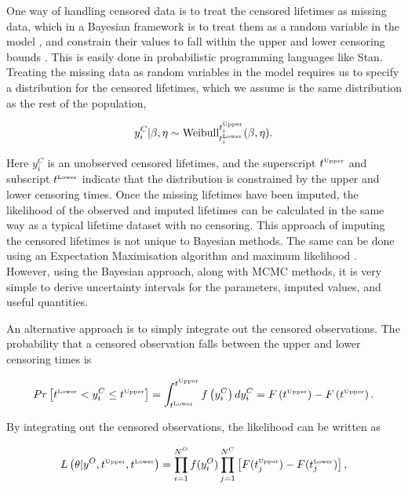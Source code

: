One way of handling censored data is to treat the censored lifetimes as missing data, which in a Bayesian framework is to treat them as a random variable in the model \citep[p.211]{reich2019}, and constrain their values to fall within the upper and lower censoring bounds \citep{stan_user_guide2024}. This is easily done in probabilistic programming languages like Stan. Treating the missing data as random variables in the model requires us to specify a distribution for the censored lifetimes, which we assume is the same distribution as the rest of the population,

\begin{equation}
    \label{eq:impute-cens}
    y^C_i|\beta, \eta \sim \hbox{Weibull}^{t^{\hbox{\tiny{Upper}}}_i}_{t^{\hbox{\tiny{Lower}}}_i}(\beta, \eta).
\end{equation}

\noindent Here $y^C_i$ is an unobserved censored lifetimes, and the superscript $t^{\hbox{\tiny{Upper}}}$ and subscript $t^{\hbox{\tiny{Lower}}}$ indicate that the distribution is constrained by the upper and lower censoring times. Once the missing lifetimes have been imputed, the likelihood of the observed and imputed lifetimes can be calculated in the same way as a typical lifetime dataset with no censoring. This approach of imputing the censored lifetimes is not unique to Bayesian methods. The same can be done using an Expectation Maximisation algorithm and maximum likelihood \citep{mitra2013}. However, using the Bayesian approach, along with MCMC methods, it is very simple to derive uncertainty intervals for the parameters, imputed values, and useful quantities.

An alternative approach is to simply integrate out the censored observations. The probability that a censored observation falls between the upper and lower censoring times is

\begin{equation}
    \label{eq:integrate-out-cens}
    Pr\left[t^{\hbox{\tiny{Lower}}} < y^C_i \leq t^{\hbox{\tiny{Upper}}}\right] = \int_{t^{\hbox{\tiny{Lower}}}}^{t^{\hbox{\tiny{Upper}}}} f\left(y^C_i\right) d y^C_i = F\left(t^{\hbox{\tiny{Upper}}}\right) - F\left(t^{\hbox{\tiny{Upper}}}\right).
\end{equation}

\noindent By integrating out the censored observations, the likelihood can be written as

\begin{equation}
    \label{eq:censored_likelihood}
    L\left(\theta|y^O, t^{\hbox{\tiny{Upper}}}, t^{\hbox{\tiny{Lower}}}\right) = \prod^{N^O}_{i = 1}f(y^O_i) \prod^{N^C}_{j = 1}\left[F(t^{\hbox{\tiny{Upper}}}_j) - F(t^{\hbox{\tiny{Lower}}}_j)\right],
\end{equation}

